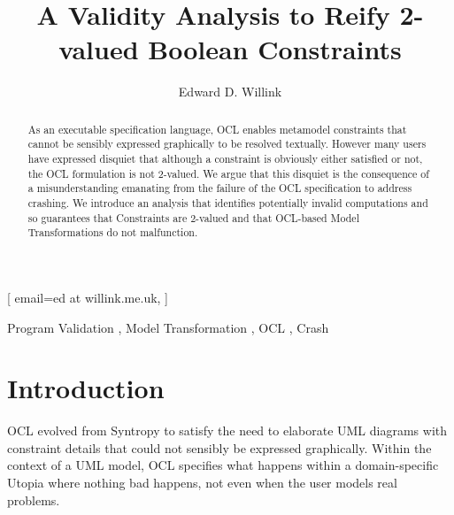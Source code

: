 \documentclass[
]{ceurart}
\begin{document}


\title{A Validity Analysis to Reify 2-valued Boolean Constraints}

\author[1]{Edward D. Willink}[%
email=ed at willink.me.uk,
]
\address[1]{Willink Transformations Ltd, Reading, England}

\begin{abstract}
As an executable specification language, OCL enables metamodel constraints that cannot be sensibly expressed graphically to be resolved textually. However many users have expressed disquiet that although a constraint is obviously either satisfied or not, the OCL formulation is not 2-valued. We argue that this disquiet is the consequence of a misunderstanding emanating from the failure of the OCL specification to address crashing. We introduce an analysis that identifies potentially invalid computations and so guarantees that Constraints are 2-valued and that OCL-based Model Transformations do not malfunction.
\end{abstract}

\begin{keywords}
  Program Validation \sep
Model Transformation \sep
OCL \sep
Crash
\end{keywords}

\maketitle

\section{Introduction}
%
OCL \cite{OCL-2.4} evolved from Syntropy to satisfy the need to elaborate UML \cite{UML-2.5} diagrams with constraint details that could not sensibly be expressed graphically. Within the context of a UML model, OCL specifies what happens within a domain-specific Utopia where nothing bad happens, not even when the user models real problems.
\end{document}
